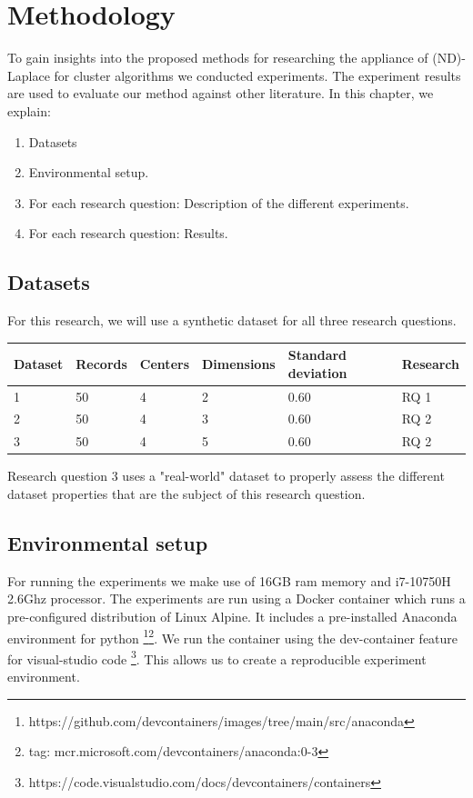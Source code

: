 \chapter{Methodology}

To gain insights into the proposed methods for researching the appliance of (ND)-Laplace for cluster algorithms we conducted experiments.
The experiment results are used to evaluate our method against other literature.
In this chapter, we explain:
\begin{enumerate}

  \item Datasets
  \item Environmental setup.
  \item For each research question: Description of the different experiments.
  \item For each research question: Results.
\end{enumerate}

\section{Datasets}
For this research, we will use a synthetic dataset for all three research questions.
\begin{table}[h]
  \begin{tabular}{@{}llllll@{}}
    \toprule
    Dataset & Records & Centers & Dimensions & Standard deviation & Research \\ \midrule
    1       & 50      & 4       & 2          & 0.60               & RQ 1     \\ \bottomrule
    2       & 50      & 4       & 3          & 0.60               & RQ 2     \\ \bottomrule
    3       & 50      & 4       & 5          & 0.60               & RQ 2     \\ \bottomrule
  \end{tabular}
\end{table}
Research question 3 uses a "real-world" dataset to properly assess the different dataset properties that are the subject of this research question.

\section{Environmental setup}
For running the experiments we make use of 16GB ram memory and i7-10750H 2.6Ghz processor.
The experiments are run using a Docker container which runs a pre-configured distribution of Linux Alpine.
It includes a pre-installed Anaconda environment for python \footnote{https://github.com/devcontainers/images/tree/main/src/anaconda}\footnote{tag: mcr.microsoft.com/devcontainers/anaconda:0-3}.
We run the container using the dev-container feature for visual-studio code \footnote{https://code.visualstudio.com/docs/devcontainers/containers}.
This allows us to create a reproducible experiment environment.
\newpage
